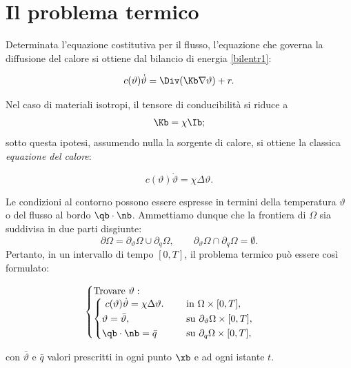 \section{Il problema termico}
Determinata l'equazione costitutiva per il flusso, l'equazione che governa la diffusione del calore si ottiene dal bilancio di energia \eqref{bilentr1}:
\begin{definition}
	\begin{equation}
		c(\vartheta)\dot{\vartheta}=\Div (\Kb \nabla \vartheta)+r.
	\end{equation}
\end{definition}

Nel caso di materiali isotropi, il tensore di conducibilità si riduce a
\begin{equation}
	\Kb =\chi \Ib;
\end{equation}
sotto questa ipotesi, assumendo nulla la sorgente di calore, si ottiene la classica \textit{equazione del calore}:
\begin{definition}
	\begin{equation}
		c(\vartheta)\dot{\vartheta}=\chi \Delta \vartheta.
	\end{equation}
\end{definition}

Le condizioni al contorno possono essere espresse in termini della temperatura $\vartheta$ o del flusso al bordo $\qb\cdot\nb$. Ammettiamo dunque che la frontiera di $\Omega$ sia suddivisa in due parti disgiunte:
\begin{equation}
\partial\Omega=\partial_\vartheta\Omega \cup\partial_q\Omega, \qquad \partial_\vartheta\Omega \cap\partial_q\Omega=\emptyset.
\end{equation}
Pertanto, in un intervallo di tempo $[0,T]$, il problema termico può essere così formulato:
\begin{definition}
	\begin{equation}
		\begin{cases}
			\mathrm{Trovare~}\mathbf{\vartheta}:\\
			\begin{cases}
				\begin{aligned}
					&\	c(\vartheta)\dot{\vartheta}=\chi \Delta \vartheta. \quad &&\mathrm{~in~}\Omega\times [0,T],\\
					&\vartheta=\bar{\vartheta}, \quad &&\mathrm{~su~}\partial_\vartheta\Omega\times [0,T],\\
					&\qb\cdot \nb=\bar{q} &&\mathrm{~su~}\partial_q\Omega\times [0,T],
				\end{aligned}
			\end{cases}
		\end{cases}
	\end{equation}
\end{definition}
con $\bar{\vartheta}$ e $\bar{q}$ valori prescritti in ogni punto $\xb$ e ad ogni istante $t$.

